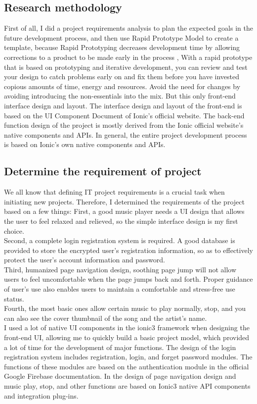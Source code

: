 \subsection{Research methodology}
First of all, I did a project requirements analysis to plan the expected goals in the future development process, and then use Rapid Prototype Model to create a template, because Rapid Prototyping decreases development time by allowing corrections to a product to be made early in the process\cite{2} , With a rapid prototype that is based on prototyping and iterative development, you can review and test your design to catch problems early on and fix them before you have invested copious amounts of time, energy and resources. Avoid the need for changes by avoiding introducing the non-essentials into the mix. But this only front-end interface design and layout. The interface design and layout of the front-end is based on the UI Component Document of Ionic's official website. The back-end function design of the project is mostly derived from the Ionic official website's native components and APIs. In general, the entire project development process is based on Ionic's own native components and APIs.
\subsection{Determine the requirement of project}
We all know that defining IT project requirements is a crucial task when initiating new projects.  Therefore, I determined the requirements of the project based on a few things: First, a good music player needs a UI design that allows the user to feel relaxed and relieved, so the simple interface design is my first choice. \\ Second, a complete login registration system is required. A good database is provided to store the encrypted user's registration information, so as to effectively protect the user's account information and password. \\ Third, humanized page navigation design, soothing page jump will not allow users to feel uncomfortable when the page jumps back and forth. Proper guidance of user's use also enables users to maintain a comfortable and stress-free use status. \\  Fourth, the most basic ones allow certain music to play normally, stop, and you can also see the cover thumbnail of the song and the artist's name. \\ I used a lot of native UI components in the ionic3 framework when designing the front-end UI, allowing me to quickly build a basic project model, which provided a lot of time for the development of major functions. The design of the login registration system includes registration, login, and forget password modules. The functions of these modules are based on the authentication module in the official Google Firebase documentation. In the design of page navigation design and music play, stop, and other functions are based on Ionic3 native API components and integration plug-ins.

